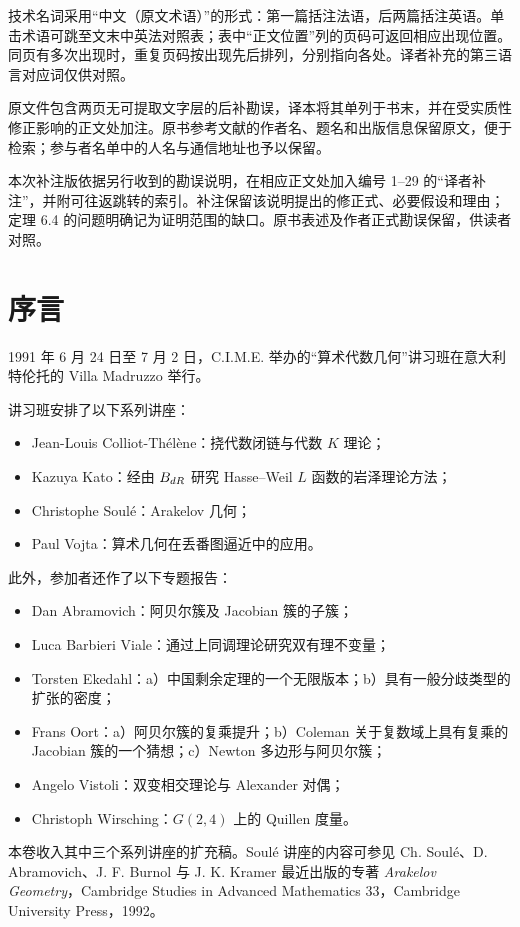 技术名词采用“中文（原文术语）”的形式：第一篇括注法语，后两篇括注英语。单击术语可跳至文末中英法对照表；表中“正文位置”列的页码可返回相应出现位置。同页有多次出现时，重复页码按出现先后排列，分别指向各处。译者补充的第三语言对应词仅供对照。

原文件包含两页无可提取文字层的后补勘误，译本将其单列于书末，并在受实质性修正影响的正文处加注。原书参考文献的作者名、题名和出版信息保留原文，便于检索；参与者名单中的人名与通信地址也予以保留。

本次补注版依据另行收到的勘误说明，在相应正文处加入编号 1--29 的“译者补注”，并附可往返跳转的索引。补注保留该说明提出的修正式、必要假设和理由；定理 6.4 的问题明确记为证明范围的缺口。原书表述及作者正式勘误保留，供读者对照。

\chapter*{序言}
1991 年 6 月 24 日至 7 月 2 日，C.I.M.E. 举办的“算术代数几何”讲习班在意大利特伦托的 Villa Madruzzo 举行。

讲习班安排了以下系列讲座：
\begin{itemize}
\item Jean-Louis Colliot-Thélène：挠代数闭链与代数 $K$ 理论；
\item Kazuya Kato：经由 $B_{dR}$ 研究 Hasse--Weil $L$ 函数的岩泽理论方法；
\item Christophe Soulé：Arakelov 几何；
\item Paul Vojta：算术几何在丢番图逼近中的应用。
\end{itemize}
此外，参加者还作了以下专题报告：
\begin{itemize}
\item Dan Abramovich：阿贝尔簇及 Jacobian 簇的子簇；
\item Luca Barbieri Viale：通过上同调理论研究双有理不变量；
\item Torsten Ekedahl：a）中国剩余定理的一个无限版本；b）具有一般分歧类型的扩张的密度；
\item Frans Oort：a）阿贝尔簇的复乘提升；b）Coleman 关于复数域上具有复乘的 Jacobian 簇的一个猜想；c）Newton 多边形与阿贝尔簇；
\item Angelo Vistoli：双变相交理论与 Alexander 对偶；
\item Christoph Wirsching：$G(2,4)$ 上的 Quillen 度量。
\end{itemize}
本卷收入其中三个系列讲座的扩充稿。Soulé 讲座的内容可参见 Ch. Soulé、D. Abramovich、J. F. Burnol 与 J. K. Kramer 最近出版的专著 \emph{Arakelov Geometry}，Cambridge Studies in Advanced Mathematics 33，Cambridge University Press，1992。

